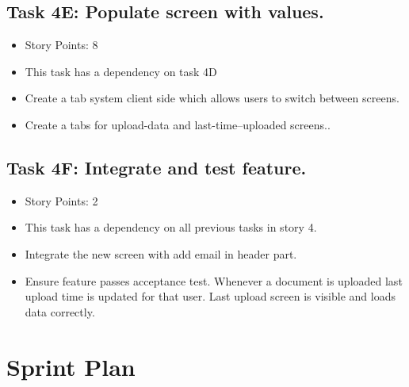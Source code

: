 \documentclass[12pt]{article}
\begin{document}
\subsection{Task 4E: Populate screen with values.}
\begin{itemize}%
\item Story Points: 8
\item This task has a dependency on task 4D
\item Create a tab system client side which allows users to switch between screens.
\item Create a tabs for upload-data and last-time--uploaded screens..
\end{itemize}

\subsection{Task 4F: Integrate and test feature.}
\begin{itemize}%
\item Story Points: 2
\item This task has a dependency on all previous tasks in story 4.
\item Integrate the new screen with add email in header part. 
\item Ensure feature passes acceptance test. Whenever a document is uploaded last upload time is updated for that user. Last upload screen is visible and loads data correctly.
\end{itemize}

\newpage
\section{Sprint Plan}
\end{document}
